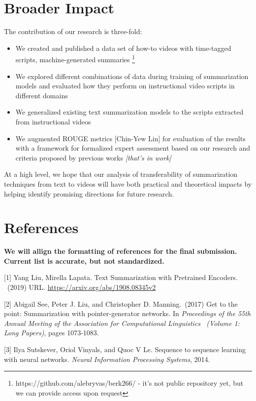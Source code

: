 \documentclass{article}
\begin{document}
\section*{Broader Impact}

The contribution of our research is three-fold:
\begin{itemize}

\item We created and published a data set of how-to videos with time-tagged scripts, machine-generated summaries \footnote{https://github.com/alebryvas/berk266/ - it's not public repository yet, but we can provide access upon request}
\item We explored different combinations of data during training of summarization models and evaluated how they perform on instructional video scripts in different domains
\item We generalized  existing text summarization models to the scripts extracted from instructional videos  
\item We augmented ROUGE metrics [Chin-Yew Lin] for evaluation of the results with a framework for formalized expert assessment based on our research and criteria proposed by previous works \textit{[that's in work]}
\end{itemize}

At a high level, we hope that our analysis of transferability of summarization techniques from text to videos will have both practical and theoretical impacts by helping identify promising directions for future research.


\section*{References} 

{\bf We will allign the formatting of references for the final submission. Current list is accurate, but not standardized.}
\medskip



[1] Yang Liu, Mirella Lapata. Text Summarization with Pretrained Encoders.  \ (2019) URL. \url{https://arxiv.org/abs/1908.08345v2}

[2] Abigail See, Peter J. Liu, and Christopher D. Manning.\ (2017) Get to the point: Summarization with pointer-generator networks. In {\it Proceedings of the 55th Annual Meeting of the Association for Computational Linguistics \ (Volume 1: Long Papers)}, pages 1073-1083.

[3] Ilya Sutskever, Oriol Vinyals, and Quoc V Le. Sequence to sequence learning with neural networks.
 {\it Neural Information Processing Systems}, 2014. 
\end{document}
